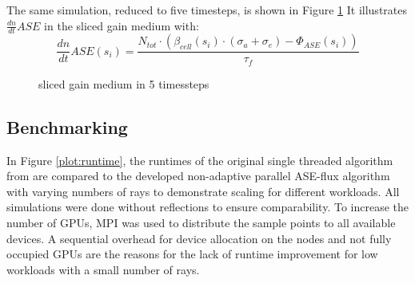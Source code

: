 The same simulation, reduced to five timesteps, is shown in Figure \ref{graphic:benchmark_4_timeslices}
It illustrates $\frac{dn}{dt} ASE$ in the sliced gain medium with:
\[ \frac{dn}{dt}ASE(s_i) = \frac{N_{tot} \cdot (\beta_{cell}(s_i) \cdot (\sigma_a + \sigma_e) - \Phi_{ASE}(s_i))}{\tau_f} \]
\begin{figure}[H]
  \centerline{
    }
  \caption{sliced gain medium in 5 timessteps}
  \label{graphic:benchmark_4_timeslices}
\end{figure}

\subsection{Benchmarking}
\label{subsec:benchmarking}
In Figure \ref{plot:runtime}, the runtimes of the original single threaded
algorithm from \cite{ASE2010} are compared to the developed non-adaptive
parallel ASE-flux algorithm with varying numbers of rays to demonstrate
scaling for different workloads. All simulations were done without
reflections to ensure comparability. To increase the number of GPUs, MPI\cite{MPI} was used to distribute the
sample points to all available devices. A sequential overhead for device
allocation 
on the nodes and not fully occupied GPUs are the reasons for the lack of runtime
improvement for low workloads with a small number of rays.


